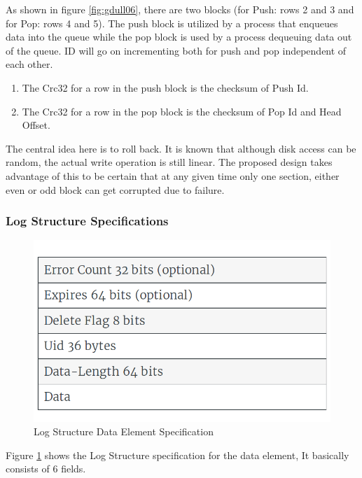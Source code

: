 \documentclass[12pt,a4paper]{article}
\begin{document}
As shown in figure \ref{fig:gdull06}, there are two blocks (for Push: rows 2 and 3 and for Pop: rows 4 and 5). The push block is utilized by a process that enqueues data into the queue while the pop block is used by a process dequeuing data out of the queue. ID will go on incrementing both for push and pop independent of each other.

\begin{enumerate}
	\item The Crc32 for a row in the push block is the checksum of Push Id.
	\item The Crc32 for a row in the pop block is the checksum of Pop Id and Head Offset.
\end{enumerate}



The central idea here is to roll back. It is known that although disk access can be random, the actual write operation is still linear. The proposed design takes advantage of this to be certain that at any given time only one section, either even or odd block can get corrupted due to failure.

 \subsubsection{Log Structure Specifications}
 
 
  \begin{figure}[!htb]
  	\centering
  	\textbf{}\par\medskip
  	\includegraphics[scale=0.4]{7}
  	\caption{Log Structure Data Element Specification}
  	\label{fig:gdull07}
  \end{figure}
  
 Figure \ref{fig:gdull07} shows the Log Structure specification for the data element, It basically consists of 6 fields.
  
\end{document}
